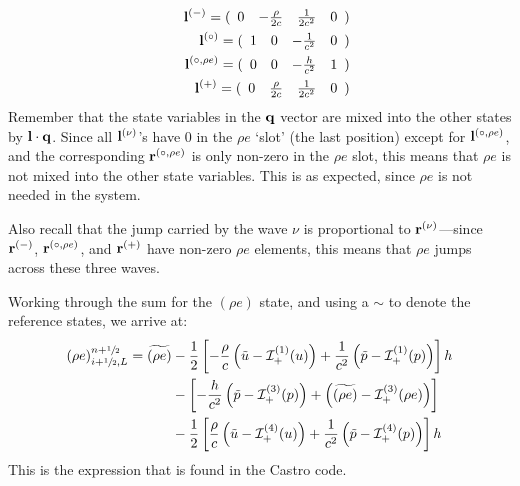 \begin{eqnarray}
&&
{\bf l}^{(-)} = ( \begin{array}{cccc} 0 & -\frac{\rho}{2c} & \frac{1}{2c^2} & 0
            \end{array} ) \nonumber \\
&&
{\bf l}^{(\circ)} = ( \begin{array}{cccc} 1 & 0 & -\frac{1}{c^2} & 0
            \end{array} ) \nonumber \\
&&
{\bf l}^{(\circ,\rho e)} = ( \begin{array}{cccc} 0 & 0 & -\frac{h}{c^2} & 1
            \end{array} ) \nonumber \\
&&
{\bf l}^{(+)} = ( \begin{array}{cccc} 0 & \frac{\rho}{2c} & \frac{1}{2c^2} & 0
            \end{array} )
\end{eqnarray}
Remember that the state variables in the ${\bf q}$ vector are mixed into the
other states by ${\bf l} \cdot {\bf q}$.  Since all ${\bf l}^{(\nu)}$'s have $0$ in the
$\rho e$ `slot' (the last position) except for ${\bf l}^{(\circ,\rho e)}$, and the
corresponding ${\bf r}^{(\circ,\rho e)}$ is only non-zero in the $\rho e$ slot, this
means that $\rho e$ is not mixed into the other state variables.  This
is as expected, since $\rho e$ is not needed in the system.

Also recall that the jump carried by the wave $\nu$ is proportional
to ${\bf r}^{(\nu)}$---since ${\bf r}^{(-)}$, ${\bf r}^{(\circ,\rho e)}$, and ${\bf r}^{(+)}$ have
non-zero $\rho e$ elements, this means that $\rho e$ jumps across
these three waves.

Working through the sum for the $(\rho e)$ state, and using a $\sim$ to
denote the reference states, we arrive at:
\begin{align}
(\rho e)_{i+{\sfrac{1}{2}},L}^{n+{\sfrac{1}{2}}} = \widetilde{(\rho e)} &-
   \frac{1}{2} \left [ -\frac{\rho}{c} \left (\tilde{u} - {\mathcal{I}}^{(1)}_+(u) \right )
                       +\frac{1}{c^2} \left (\tilde{p} - {\mathcal{I}}^{(1)}_+(p) \right )
               \right ] h \nonumber \\
  &-
    \left [ -\frac{h}{c^2} \left (\tilde{p} - {\mathcal{I}}^{(3)}_+(p) \right )
                       + \left (\widetilde{(\rho e)} - {\mathcal{I}}^{(3)}_+(\rho e) \right )
               \right ] \nonumber \\
  &-
   \frac{1}{2} \left [ \frac{\rho}{c} \left (\tilde{u} - {\mathcal{I}}^{(4)}_+(u) \right )
                       +\frac{1}{c^2} \left (\tilde{p} - {\mathcal{I}}^{(4)}_+(p) \right )
               \right ] h
\end{align}
This is the expression that is found in the Castro code.



